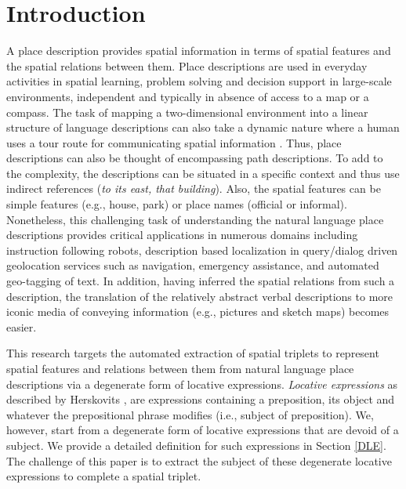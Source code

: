 \documentclass[letter]{sig-alternate}
\begin{document}
\section{Introduction}
A place description provides spatial information in terms of spatial features and the spatial relations between them. Place descriptions are used in everyday activities in spatial learning, problem solving and decision support in large-scale environments, independent and typically in absence of access to a map or a compass. The task of mapping a two-dimensional environment into a linear structure of language descriptions can also take a dynamic nature where a human uses a tour route for communicating spatial information \cite{linde:spatial, daniel:modes}. Thus, place descriptions can also be thought of encompassing path descriptions. To add to the complexity, the descriptions can be situated in a specific context and thus use indirect references (\textit{to its east, that building}). 
Also, the spatial features can be simple features (e.g., house, park) or place names (official or informal). 
Nonetheless, this challenging task of understanding the natural language place descriptions provides critical applications in numerous domains including instruction following robots, description based localization in query/dialog driven geolocation services such as navigation, emergency assistance, and automated geo-tagging of text. In addition, having inferred the spatial relations from such a description, the translation of the relatively abstract verbal descriptions to more iconic media of conveying information (e.g., pictures and sketch maps) becomes easier.

This research targets the automated extraction of spatial triplets to represent spatial features and relations between them from natural language place descriptions via a degenerate form of locative expressions. \textit{Locative expressions} as described by Herskovits \cite{herskovits:pragmatics}, are expressions containing a preposition, its object and whatever the prepositional phrase modifies (i.e., subject of preposition). We, however, start from a degenerate form of locative expressions that are devoid of a subject. We provide a detailed definition for such expressions in Section \ref{DLE}. The challenge of this paper is to extract the subject of these degenerate locative expressions to complete a spatial triplet.
\end{document}
